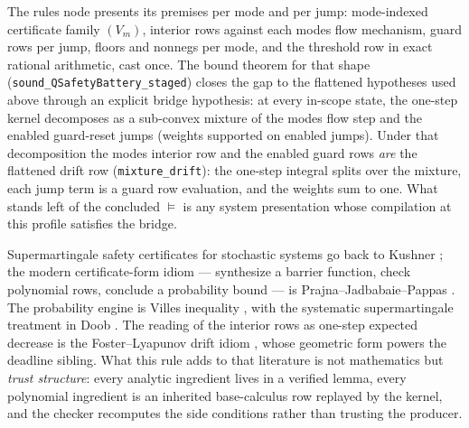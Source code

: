 \begin{bremark}
\label{rem:qsb-staged}
The rule\textquotesingle s node presents its premises per mode and per
jump: mode-indexed certificate family $(V_m)$, interior rows against
each mode\textquotesingle s flow mechanism, guard rows per jump, floors
and nonnegs per mode, and the threshold row in exact rational
arithmetic, cast once. The bound theorem for that shape
(\texttt{sound\_QSafetyBattery\_staged}) closes the gap to the flattened
hypotheses used above through an explicit bridge hypothesis: at every
in-scope state, the one-step kernel decomposes as a sub-convex mixture
of the mode\textquotesingle s flow step and the enabled guard-reset
jumps (weights supported on enabled jumps). Under that decomposition the
mode\textquotesingle s interior row and the enabled guard rows
\emph{are} the flattened drift row (\texttt{mixture\_drift}): the
one-step integral splits over the mixture, each jump term is a guard row
evaluation, and the weights sum to one. What stands left of the
concluded $\vDash$ is any system presentation whose compilation at this
profile satisfies the bridge.
\end{bremark}

\begin{bremark}\label{rem:qsb-lit}
Supermartingale safety certificates for stochastic systems go back to
Kushner \cite{kushner1967}; the modern certificate-form idiom ---
synthesize a barrier function, check polynomial rows, conclude a
probability bound --- is Prajna--Jadbabaie--Pappas
\cite{prajnajadbabaiepappas2007}. The probability engine is
Ville\textquotesingle s inequality \cite{ville1939}, with the systematic
supermartingale treatment in Doob \cite{doob1953}. The reading of the
interior rows as one-step expected decrease is the Foster--Lyapunov
drift idiom \cite{meyntweedie2009}, whose geometric form powers the
deadline sibling. What this rule adds to that literature is not
mathematics but \emph{trust structure}: every analytic ingredient lives
in a verified lemma, every polynomial ingredient is an inherited
base-calculus row replayed by the kernel, and the checker recomputes the
side conditions rather than trusting the producer.
\end{bremark}

